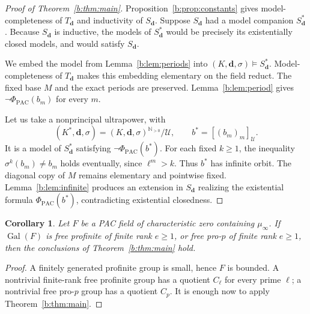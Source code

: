 \documentclass[10pt,a4paper]{amsart}
\renewcommand{\ge}{\geqslant}
\newtheorem{corollary}[theorem]{Corollary}
\theoremstyle{definition}
\newcommand{\N}{\mathbb N}
\newcommand{\bd}{\boldsymbol d}
\DeclareMathOperator{\Gal}{Gal}
\begin{document}
\begin{proof}[Proof of Theorem~\ref{b:thm:main}]
Proposition~\ref{b:prop:constants} gives model-completeness of $T_{\bd}$
and inductivity of $S_{\bd}$. Suppose $S_{\bd}$ had a model companion
$S_{\bd}^*$. Because $S_{\bd}$ is inductive, the models of $S_{\bd}^*$
would be precisely its existentially closed models, and would
satisfy $S_{\bd}$.

We embed the model from Lemma~\ref{b:lem:periods} into
$(K,\bd,\sigma)\models S_{\bd}^*$. Model-completeness of $T_{\bd}$
makes this embedding elementary on the field reduct. The fixed base
$M$ and the exact periods are preserved. Lemma~\ref{b:lem:period}
gives $\neg\Phi_{\mathrm{PAC}}(b_m)$ for every $m$.

Let us take a nonprincipal ultrapower, with
\[
(K^*,\bd,\sigma)=(K,\bd,\sigma)^{\N_{>0}}/\mathcal U,\qquad
b^*=[(b_m)_m]_{\mathcal U}.
\]
It is a model of $S_{\bd}^*$ satisfying $\neg\Phi_{\mathrm{PAC}}(b^*)$. For each fixed
$k\ge1$, the inequality $\sigma^k(b_m)\ne b_m$ holds eventually,
since $\ell^m>k$. Thus $b^*$ has infinite orbit. The diagonal copy
of $M$ remains elementary and pointwise fixed. Lemma~\ref{b:lem:infinite}
produces an extension in $S_{\bd}$ realizing the existential formula
$\Phi_{\mathrm{PAC}}(b^*)$, contradicting existential closedness.
\end{proof}



\begin{corollary}\label{b:cor:free}
Let $F$ be a PAC field of characteristic zero containing $\mu_\infty$.
If $\Gal(F)$ is free profinite of finite rank $e\ge1$, or free
pro-$p$ of finite rank $e\ge1$, then the conclusions of
Theorem~\ref{b:thm:main} hold.
\end{corollary}

\begin{proof}
A finitely generated profinite group is small, hence $F$ is bounded.
A nontrivial finite-rank free profinite group has a quotient $C_\ell$
for every prime $\ell$; a nontrivial free pro-$p$ group has a quotient
$C_p$. It is enough now to apply Theorem~\ref{b:thm:main}.
\end{proof}
\end{document}
